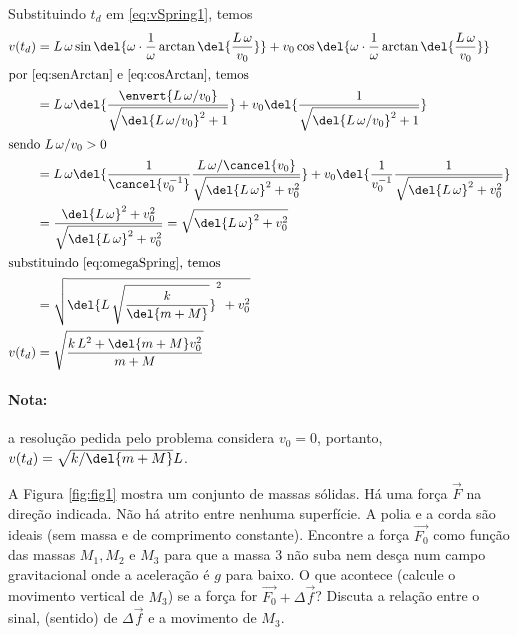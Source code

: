 \documentclass[]{IMTexam}
\begin{document}
\begin{questions}
\begin{solution}
		Substituindo $ t_d $ em \ref{eq:vSpring1}, temos
		\begin{align*}
			v(t_d) & =L\,\omega\sin\del{\omega\cdot\dfrac{1}{\omega}\arctan\del{\dfrac{L\,\omega}{v_0}}}+v_0\cos\del{\omega\cdot\dfrac{1}{\omega}\arctan\del{\dfrac{L\,\omega}{v_0}}}                         \\
			\intertext{por \ref{eq:senArctan} e \ref{eq:cosArctan}, temos}
			       & =L\,\omega\del{\dfrac{\envert{L\,\omega/v_0}}{\sqrt{\del{L\,\omega/v_0}^{2}+1}}}+v_0\del{\dfrac{1}{\sqrt{\del{L\,\omega/v_0}^{2}+1}}}                                                    \\
			\intertext{sendo $ L\,\omega/v_0>0 $}
			       & =L\,\omega\del{\dfrac{1}{\cancel{v_0^{-1}}}\dfrac{L\,\omega/\cancel{v_0}}{\sqrt{\del{L\,\omega}^{2}+v_0^{2}}}}+v_0\del{\dfrac{1}{v_0^{-1}}\dfrac{1}{\sqrt{\del{L\,\omega}^{2}+v_0^{2}}}} \\
			       & =\dfrac{\del{L\,\omega}^{2}+v_0^{2}}{\sqrt{\del{L\,\omega}^{2}+v_0^{2}}}=\sqrt{\del{L\,\omega}^{2}+v_0^{2}}                                                                              \\
			\intertext{substituindo \ref{eq:omegaSpring}, temos}
			       & =\sqrt{\del{L\,\sqrt{\dfrac{k}{\del{m+M}}}}^{2}+v_0^{2}}                                                                                                                                 \\
			v(t_d) & =\sqrt{\dfrac{k\,L^{2}+\del{m+M}v_0^{2}}{m+M}}
		\end{align*}

		\paragraph{Nota:} a resolução pedida pelo problema considera $ v_0=0 $, portanto, $ v(t_d) =\sqrt{k/\del{m+M}}L $.
	\end{solution}


	\question A Figura \ref{fig:fig1} mostra um conjunto de massas sólidas. Há uma força $\vec{F}$ na direção indicada. Não há atrito entre nenhuma superfície. A polia e a corda são ideais (sem massa e de comprimento constante). Encontre a força $\vec{F_0}$ como função das massas $ M_1, M_2 $ e $ M_3 $ para que a massa 3 não suba nem desça num campo gravitacional onde a aceleração é $g$ para baixo. O que acontece (calcule o movimento vertical de $ M_3 $) se a força for $ \vec{F_0} + \Delta \vec{f} $? Discuta a relação entre o sinal, (sentido) de $ \Delta\vec{f} $ e a movimento de $ M_3 $.


\end{questions}
\end{document}
